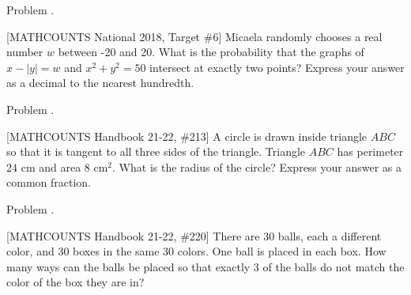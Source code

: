 \documentclass[9pt]{beamer}
\newcounter{problem}[section]
\begin{document}
\begin{frame}[t, fragile]{Problem \thesection.\theproblem}
    \begin{block}{}[MATHCOUNTS National 2018, Target \#6]
    Micaela randomly chooses a real number $ w $ between -20 and 20. What is the probability that the graphs of $ x -|y| = w $ and $ x^2 + y^2 = 50 $ intersect at exactly two points? Express your answer as a decimal to the nearest hundredth.
    
	
    \end{block}
\end{frame}

\begin{frame}[t, fragile]{Problem \thesection.\theproblem}
    \begin{block}{}[MATHCOUNTS Handbook 21-22, \#213]
    A circle is drawn inside triangle $ABC$ so that it is tangent to all three sides of the triangle. Triangle $ABC$ has perimeter $24$ cm and area $8 \text{ cm}^2$. What is the radius of the circle? Express your answer as a common fraction.
	
	
    \end{block}
\end{frame}

\begin{frame}[t, fragile]{Problem \thesection.\theproblem}
    \begin{block}{}[MATHCOUNTS Handbook 21-22, \#220]
    There are 30 balls, each a different color, and 30 boxes in the same 30 colors. One ball is placed in each box. How many ways can the balls be placed so that exactly 3 of the balls do not match the color of the box they are in?
	
	
    \end{block}
\end{frame}
\end{document}
